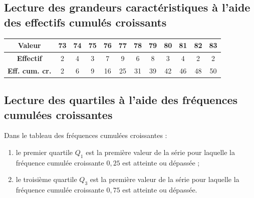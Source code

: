 \bigskip


\subsection{Lecture des grandeurs caractéristiques à l'aide des
  effectifs cumulés croissants}

  \begin{center}
\begin{tabular}[h]{|c||c|c|c|c|c|c|c|c|c|c|c|}
    \hline
  \textbf{Valeur} & 73 & 74 & 75 & 76 & 77 & 78 & 79 & 80 & 81 & 82 & 83 \\
  \hline
  \textbf{Effectif} & 2 & 4 & 3 & 7 & 9 & 6 & 8 & 3 & 4 & 2 & 2 \\ 
  \hline
  \textbf{Eff. cum. cr.} & 2 & 6 & 9 & 16 & 25 & 31 & 39 & 42 & 46 & 48 & 50 \\ 
  \hline
\end{tabular}
      
  \end{center}



\bigskip

\subsection{Lecture des quartiles à l'aide des fréquences cumulées croissantes}

Dans le tableau des fréquences cumulées croissantes :
\begin{enumerate}
\item le premier quartile $Q_1$ est la première valeur de la série
  pour laquelle la fréquence cumulée croissante $0,25$ est atteinte ou
  dépassée ;
\item le troisième quartile $Q_3$ est la première valeur de la série
  pour laquelle la fréquence cumulée croissante $0,75$ est atteinte ou
  dépassée.
\end{enumerate}

